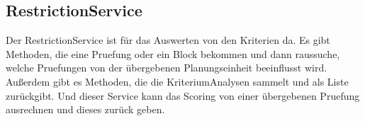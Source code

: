 \subsection{RestrictionService}\label{subsec:RestrictionService}
Der RestrictionService ist für das Auswerten von den Kriterien da.
Es gibt Methoden, die eine Pruefung oder ein Block bekommen und dann raussuche, welche Pruefungen
von der übergebenen Planungseinheit beeinflusst wird.
Außerdem gibt es Methoden, die die KriteriumAnalysen sammelt und als Liste zurückgibt.
Und dieser Service kann das Scoring von einer übergebenen Pruefung ausrechnen und dieses zurück geben.